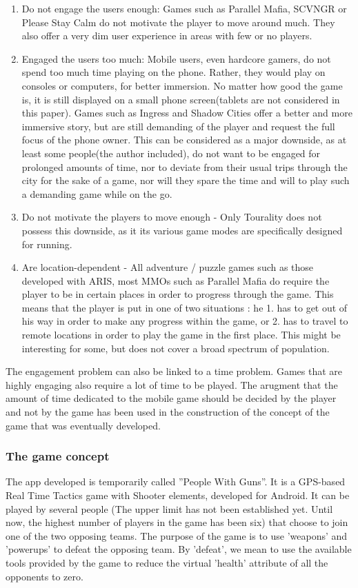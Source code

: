 \begin{enumerate}
  \item Do not engage the users enough: Games such as Parallel Mafia, SCVNGR or
  Please Stay Calm do not motivate the player to move around much. They also
  offer a very dim user experience in areas with few or no players.
  \item Engaged the users too much: Mobile users, even hardcore gamers, do not
  spend too much time playing on the phone. Rather, they would play on consoles
  or computers, for better immersion. No matter how good the game is, it is
  still displayed on a small phone screen(tablets are not considered in this
  paper). Games such as Ingress and Shadow Cities offer a better and more
  immersive story, but are still demanding of the player and request the full
  focus of the phone owner. This can be considered as a major downside, as at
  least some people(the author included), do not want to be engaged for
  prolonged amounts of time, nor to deviate from their usual trips through
  the city for the sake of a game, nor will they spare the time and will to play
  such a demanding game while on the go.  
  \item Do not motivate the players to move enough - Only Tourality does not
  possess this downside, as it its various game modes are specifically designed
  for running.
  \item Are location-dependent - All adventure / puzzle games such as those
  developed with ARIS, most MMOs such as Parallel Mafia do require the player to
  be in certain places in order to progress through the game. This means that
  the player is put in one of two situations : he 1. has to get out of
  his way in order to make any progress within the game, or 2. has to travel
  to remote locations in order to play the game in the first place. This might
  be interesting for some, but does not cover a broad spectrum of population. 
\end{enumerate}

The engagement problem can also be linked to a time problem. Games that are
highly engaging also require a lot of time to be played. The arugment that the
amount of time dedicated to the mobile game should be decided by the player and
not by the game has been used in the construction of the concept of the game
that was eventually developed. \newline

\subsubsection{The game concept}
The app developed is temporarily called ''People With Guns''. It is a GPS-based
Real Time Tactics game with Shooter elements, developed for Android. It can be
played by several people (The upper limit has not been established yet. Until
now, the highest number of players in the game has been six) that choose to join
one of the two opposing teams. The purpose of the game is to use 'weapons' and
'powerups' to defeat the opposing team. By 'defeat', we mean to use the
available tools provided by the game to reduce the virtual 'health' attribute of
all the opponents to zero.\newline

